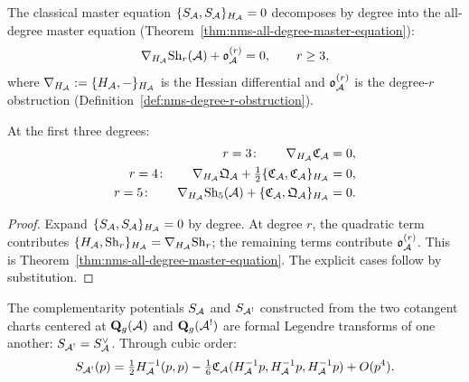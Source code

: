 \begin{corollary}
\label{cor:thqg-III-shadow-master-equations}
The classical master equation $\{S_{\mathcal{A}}, S_{\mathcal{A}}\}_{H_{\mathcal{A}}} = 0$
decomposes by degree into the all-degree master equation
\textup{(}Theorem~\textup{\ref{thm:nms-all-degree-master-equation})}:
\begin{equation}\label{eq:thqg-III-all-degree-master}
\nabla_{H_{\mathcal{A}}} \mathrm{Sh}_r(\mathcal{A}) + \mathfrak{o}_{\mathcal{A}}^{(r)} = 0,
\qquad r \ge 3,
\end{equation}
where
$\nabla_{H_{\mathcal{A}}} := \{H_{\mathcal{A}}, -\}_{H_{\mathcal{A}}}$ is the Hessian
differential and $\mathfrak{o}_{\mathcal{A}}^{(r)}$ is the degree-$r$
obstruction
\textup{(}Definition~\textup{\ref{def:nms-degree-r-obstruction})}.

At the first three degrees:
\begin{align}
r = 3\colon\qquad
\nabla_{H_{\mathcal{A}}} \mathfrak{C}_{\mathcal{A}} &= 0,
\label{eq:thqg-III-cubic-master}
\\
r = 4\colon\qquad
\nabla_{H_{\mathcal{A}}} \mathfrak{Q}_{\mathcal{A}}
+ \tfrac{1}{2}\{\mathfrak{C}_{\mathcal{A}}, \mathfrak{C}_{\mathcal{A}}\}_{H_{\mathcal{A}}}
&= 0,
\label{eq:thqg-III-quartic-master}
\\
r = 5\colon\qquad
\nabla_{H_{\mathcal{A}}} \mathrm{Sh}_5(\mathcal{A})
+ \{\mathfrak{C}_{\mathcal{A}}, \mathfrak{Q}_{\mathcal{A}}\}_{H_{\mathcal{A}}}
&= 0.
\label{eq:thqg-III-quintic-master}
\end{align}
\end{corollary}

\begin{proof}
Expand $\{S_{\mathcal{A}}, S_{\mathcal{A}}\}_{H_{\mathcal{A}}} = 0$ by degree.
At degree $r$, the quadratic term contributes
$\{H_{\mathcal{A}}, \mathrm{Sh}_r\}_{H_{\mathcal{A}}} = \nabla_{H_{\mathcal{A}}} \mathrm{Sh}_r$;
the remaining terms contribute $\mathfrak{o}_{\mathcal{A}}^{(r)}$.
This is Theorem~\ref{thm:nms-all-degree-master-equation}.
The explicit cases follow by substitution.
\end{proof}

\begin{proposition}
\label{prop:thqg-III-legendre}
The complementarity potentials $S_{\mathcal{A}}$ and $S_{\mathcal{A}^!}$
constructed from the two cotangent charts centered at
$\mathbf{Q}_g(\mathcal{A})$ and $\mathbf{Q}_g(\mathcal{A}^!)$ are formal
Legendre transforms of one another:
$S_{\mathcal{A}^!} = S_{\mathcal{A}}^{\vee}$.
Through cubic order:
\begin{equation}\label{eq:thqg-III-legendre-cubic}
S_{\mathcal{A}^!}(p)
= \tfrac{1}{2} H_{\mathcal{A}}^{-1}(p, p)
- \tfrac{1}{6}
 \mathfrak{C}_{\mathcal{A}}(H_{\mathcal{A}}^{-1}p, H_{\mathcal{A}}^{-1}p, H_{\mathcal{A}}^{-1}p)
+ O(p^4).
\end{equation}
\end{proposition}

